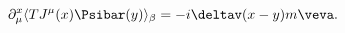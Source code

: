 \begin{equation}
\label{eq:wt_1}
  \partial^x_\mu\langle T J^\mu(x)\Psibar(y) \rangle_\beta =
  -i\deltav(x-y)m\veva.
\end{equation}


